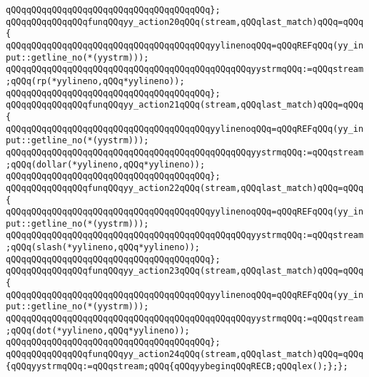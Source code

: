 \verb|qQQqqQQqqQQqqQQqqQQqqQQqqQQqqQQqqQQqqQQq};|\newline
\verb|qQQqqQQqqQQqqQQqfunqQQqyy_action20qQQq(stream,qQQqlast_match)qQQq=qQQq{|\newline
\verb|qQQqqQQqqQQqqQQqqQQqqQQqqQQqqQQqqQQqqQQqyylinenoqQQq=qQQqREFqQQq(yy_input::getline_no(*(yystrm)));|\newline
\newline
\verb|qQQqqQQqqQQqqQQqqQQqqQQqqQQqqQQqqQQqqQQqqQQqqQQqyystrmqQQq:=qQQqstream;qQQq(rp(*yylineno,qQQq*yylineno));|\newline
\verb|qQQqqQQqqQQqqQQqqQQqqQQqqQQqqQQqqQQqqQQq};|\newline
\verb|qQQqqQQqqQQqqQQqfunqQQqyy_action21qQQq(stream,qQQqlast_match)qQQq=qQQq{|\newline
\verb|qQQqqQQqqQQqqQQqqQQqqQQqqQQqqQQqqQQqqQQqyylinenoqQQq=qQQqREFqQQq(yy_input::getline_no(*(yystrm)));|\newline
\newline
\verb|qQQqqQQqqQQqqQQqqQQqqQQqqQQqqQQqqQQqqQQqqQQqqQQqyystrmqQQq:=qQQqstream;qQQq(dollar(*yylineno,qQQq*yylineno));|\newline
\verb|qQQqqQQqqQQqqQQqqQQqqQQqqQQqqQQqqQQqqQQq};|\newline
\verb|qQQqqQQqqQQqqQQqfunqQQqyy_action22qQQq(stream,qQQqlast_match)qQQq=qQQq{|\newline
\verb|qQQqqQQqqQQqqQQqqQQqqQQqqQQqqQQqqQQqqQQqyylinenoqQQq=qQQqREFqQQq(yy_input::getline_no(*(yystrm)));|\newline
\newline
\verb|qQQqqQQqqQQqqQQqqQQqqQQqqQQqqQQqqQQqqQQqqQQqqQQqyystrmqQQq:=qQQqstream;qQQq(slash(*yylineno,qQQq*yylineno));|\newline
\verb|qQQqqQQqqQQqqQQqqQQqqQQqqQQqqQQqqQQqqQQq};|\newline
\verb|qQQqqQQqqQQqqQQqfunqQQqyy_action23qQQq(stream,qQQqlast_match)qQQq=qQQq{|\newline
\verb|qQQqqQQqqQQqqQQqqQQqqQQqqQQqqQQqqQQqqQQqyylinenoqQQq=qQQqREFqQQq(yy_input::getline_no(*(yystrm)));|\newline
\newline
\verb|qQQqqQQqqQQqqQQqqQQqqQQqqQQqqQQqqQQqqQQqqQQqqQQqyystrmqQQq:=qQQqstream;qQQq(dot(*yylineno,qQQq*yylineno));|\newline
\verb|qQQqqQQqqQQqqQQqqQQqqQQqqQQqqQQqqQQqqQQq};|\newline
\verb|qQQqqQQqqQQqqQQqfunqQQqyy_action24qQQq(stream,qQQqlast_match)qQQq=qQQq{qQQqyystrmqQQq:=qQQqstream;qQQq{qQQqyybeginqQQqRECB;qQQqlex();};};|\newline
